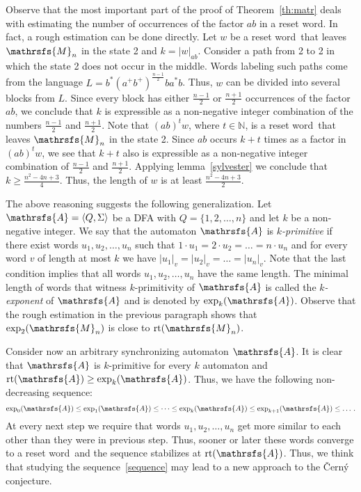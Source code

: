 \documentclass[11pt]{llncs}
\newcommand{\sw}{reset word}
\DeclareMathOperator{\rt}{rt}
\begin{document}
Observe that the most important part of the proof of Theorem~\ref{th:matr}
deals with estimating the number of occurrences of the factor $ab$ in a reset
word. In fact, a rough estimation can be done directly. Let $w$ be a \sw\ that
leaves $\mathrsfs{M}_n$ in the state 2 and $k=|w|_{ab}$. Consider a path from 2
to 2 in which the state 2 does not occur in the middle. Words labeling such
paths come from the language $L=b^*(a^+b^+)^{\frac{n - 1}{2}}ba^*b$. Thus, $w$
can be divided into several blocks from $L$. Since every block has either
$\frac{n - 1}{2}$ or $\frac{n+1}{2}$ occurrences of the factor $ab$, we
conclude that $k$ is expressible as a non-negative integer combination of the
numbers $\frac{n-1}{2}$ and $\frac{n+1}{2}$. Note that $(ab)^tw$, where $t \in
\mathbb{N}$, is a \sw\ that leaves $\mathrsfs{M}_n$ in the state 2. Since $ab$
occurs $k + t$ times as a factor in $(ab)^tw$, we see that $k + t$ also is
expressible as a non-negative integer combination of $\frac{n-1}{2}$ and
$\frac{n+1}{2}$. Applying lemma~\ref{sylvester} we conclude that $k \geq
\frac{n^2 - 4n + 3}{4}$. Thus, the length of $w$ is at least $\frac{n^2 - 4n +
3}{2}$.

The above reasoning  suggests the following generalization. Let $\mathrsfs{A} =
\langle Q, \Sigma \rangle$ be a DFA with $Q=\{1,2,\dots,n\}$ and let $k$ be a
non-negative integer. We say that the automaton $\mathrsfs{A}$ is
\emph{$k$-primitive} if there exist words $u_1,u_2,\dots,u_n$ such that $1\cdot
u_1=2\cdot u_2=\dots=n\cdot u_n$ and for every word $v$ of length at most $k$
we have $|u_1|_v = |u_2|_v = \ldots = |u_n|_v$. Note that the last condition
implies that all words $u_1,u_2,\dots,u_n$ have the same length. The minimal
length of words that witness $k$-primitivity of  $\mathrsfs{A}$ is called the
\emph{$k$-exponent} of $\mathrsfs{A}$ and is denoted by $\exp_k(\mathrsfs{A})$.
Observe that the rough estimation in the previous paragraph shows that
$\exp_2(\mathrsfs{M}_n)$ is close to $\rt(\mathrsfs{M}_n)$.

Consider now an arbitrary synchronizing automaton $\mathrsfs{A}$. It is clear
that $\mathrsfs{A}$ is $k$-primitive for every $k$ automaton  and
$\rt(\mathrsfs{A}) \geq \exp_k(\mathrsfs{A})$. Thus, we have the following
non-decreasing sequence:
\begin{equation}
\label{sequence}
\exp_0(\mathrsfs{A}) \leq \exp_1(\mathrsfs{A}) \leq \dots \leq
\exp_k(\mathrsfs{A}) \leq \exp_{k + 1}(\mathrsfs{A}) \leq \dotsc.
\end{equation}
At every next step we require that words $u_1,u_2,\dots,u_n$ get more similar
to each other than they were in previous step. Thus, sooner or later these
words converge to a \sw\ and the sequence stabilizes at $\rt(\mathrsfs{A})$.
Thus, we think that studying the sequence~\eqref{sequence} may lead to a new
approach to the \v{C}ern\'{y} conjecture.
\end{document}
